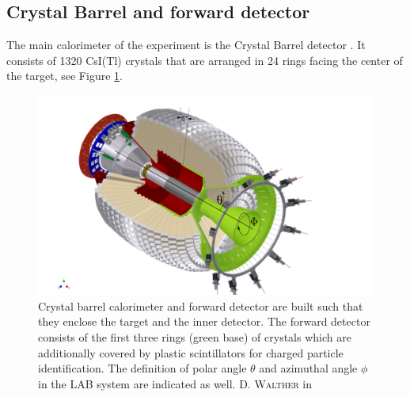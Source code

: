 \subsection{Crystal Barrel and forward detector}
\label{sec:cb}
The main calorimeter of the experiment is the Crystal Barrel detector \cite{cbdet}. It consists of 1320 CsI(Tl) crystals that are arranged in 24 rings facing the center of the target, see Figure \ref{fig:cb}.
\begin{figure}[htbp]
	\centering
	\includegraphics[width=\linewidth]{figs/cb_fp_in.pdf}
	\caption{Crystal barrel calorimeter and forward detector are built such that they enclose the target and the inner detector. The forward detector consists of the first three rings (green base) of crystals which are additionally covered by plastic scintillators for charged particle identification. The definition of polar angle $\theta$ and azimuthal angle $\phi$ in the LAB system are indicated as well. \textsc{D. Walther} in \cite{urban}}
	\label{fig:cb}

\end{figure}
